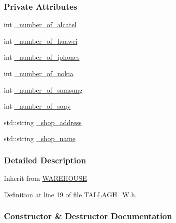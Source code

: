\subsubsection*{Private Attributes}
\begin{DoxyCompactItemize}
\item 
int \hyperlink{class_t_a_l_l_a_g_h___w_a034f2ba8c42c1b81ae947b15732e5881_a034f2ba8c42c1b81ae947b15732e5881}{\+\_\+number\+\_\+of\+\_\+alcatel}
\item 
int \hyperlink{class_t_a_l_l_a_g_h___w_ab966ff243f14eefc346e0b031f21c9b6_ab966ff243f14eefc346e0b031f21c9b6}{\+\_\+number\+\_\+of\+\_\+huawei}
\item 
int \hyperlink{class_t_a_l_l_a_g_h___w_ad8a7847f895cd13b45331e4f3cd20c2e_ad8a7847f895cd13b45331e4f3cd20c2e}{\+\_\+number\+\_\+of\+\_\+iphones}
\item 
int \hyperlink{class_t_a_l_l_a_g_h___w_aa095820dca65526e795d64f31a3aaec1_aa095820dca65526e795d64f31a3aaec1}{\+\_\+number\+\_\+of\+\_\+nokia}
\item 
int \hyperlink{class_t_a_l_l_a_g_h___w_a2438dbd2a390036bfd35f46a63b5b9bf_a2438dbd2a390036bfd35f46a63b5b9bf}{\+\_\+number\+\_\+of\+\_\+samsung}
\item 
int \hyperlink{class_t_a_l_l_a_g_h___w_ab101d3ac8747eef48371cd9078d2366e_ab101d3ac8747eef48371cd9078d2366e}{\+\_\+number\+\_\+of\+\_\+sony}
\item 
std\+::string \hyperlink{class_t_a_l_l_a_g_h___w_a268003f2cd359fa50c6061f1ad011c67_a268003f2cd359fa50c6061f1ad011c67}{\+\_\+shop\+\_\+address}
\item 
std\+::string \hyperlink{class_t_a_l_l_a_g_h___w_a2d63785f290e8be76f3c4543e5df9508_a2d63785f290e8be76f3c4543e5df9508}{\+\_\+shop\+\_\+name}
\end{DoxyCompactItemize}


\subsubsection{Detailed Description}
Inherit from \hyperlink{class_w_a_r_e_h_o_u_s_e}{W\+A\+R\+E\+H\+O\+U\+SE} 

Definition at line \hyperlink{_t_a_l_l_a_g_h___w_8h_source_l00019}{19} of file \hyperlink{_t_a_l_l_a_g_h___w_8h_source}{T\+A\+L\+L\+A\+G\+H\+\_\+\+W.\+h}.



\subsubsection{Constructor \& Destructor Documentation}

